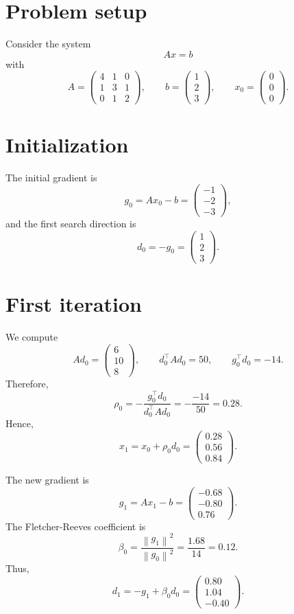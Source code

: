 \documentclass[11pt,a4paper]{report}
\theoremstyle{definition}
\theoremstyle{plain}
\theoremstyle{remark}
\newcommand{\norm}[1]{\left\lVert #1 \right\rVert}
\begin{document}
\section{Problem setup}

Consider the system
\[
A x=b
\]
with
\[
A=
\begin{pmatrix}
4 & 1 & 0\\
1 & 3 & 1\\
0 & 1 & 2
\end{pmatrix},
\qquad
b=
\begin{pmatrix}
1\\
2\\
3
\end{pmatrix},
\qquad
x_0=
\begin{pmatrix}
0\\
0\\
0
\end{pmatrix}.
\]

\section{Initialization}

The initial gradient is
\[
g_0=Ax_0-b=
\begin{pmatrix}
-1\\
-2\\
-3
\end{pmatrix},
\]
and the first search direction is
\[
d_0=-g_0=
\begin{pmatrix}
1\\
2\\
3
\end{pmatrix}.
\]

\section{First iteration}

We compute
\[
Ad_0=
\begin{pmatrix}
6\\
10\\
8
\end{pmatrix},
\qquad
d_0^\top Ad_0=50,
\qquad
g_0^\top d_0=-14.
\]
Therefore,
\[
\rho_0=-\frac{g_0^\top d_0}{d_0^\top Ad_0}
=
-\frac{-14}{50}
=
0.28.
\]
Hence,
\[
x_1=x_0+\rho_0d_0=
\begin{pmatrix}
0.28\\
0.56\\
0.84
\end{pmatrix}.
\]

The new gradient is
\[
g_1=Ax_1-b=
\begin{pmatrix}
-0.68\\
-0.80\\
0.76
\end{pmatrix}.
\]
The Fletcher-Reeves coefficient is
\[
\beta_0=
\frac{\norm{g_1}^2}{\norm{g_0}^2}
=
\frac{1.68}{14}
=
0.12.
\]
Thus,
\[
d_1=-g_1+\beta_0d_0=
\begin{pmatrix}
0.80\\
1.04\\
-0.40
\end{pmatrix}.
\]
\end{document}
